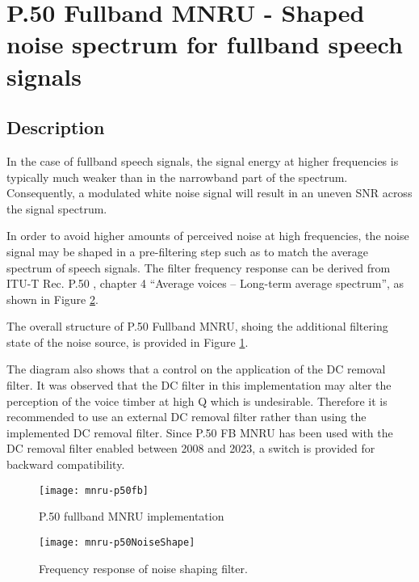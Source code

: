 \section{P.50 Fullband MNRU - Shaped noise spectrum for fullband speech signals} \label{fullband}

\subsection {Description}

In the case of fullband speech signals, the signal energy at higher frequencies is typically much weaker than in the
narrowband part of the spectrum.
Consequently, a modulated white noise signal will result in an uneven SNR across the signal spectrum.

In order to avoid higher amounts of perceived noise at high frequencies, the noise signal may be shaped in a pre-filtering
step such as to match the average spectrum of speech signals.
The filter frequency response can be derived from ITU-T Rec. P.50 \cite{P.50}, chapter 4 “Average voices – Long-term
average spectrum”, as shown in Figure \ref{MNRUP50}.

The overall structure of P.50 Fullband MNRU, shoing the additional filtering state of the noise source, is provided in
Figure \ref{MNRUP50FB}.

The diagram also shows that a control on the application of the DC removal filter.
It was observed that the DC filter in this implementation may alter the perception of the voice timber at high Q which
is undesirable.
Therefore it is recommended to use an external DC removal filter rather than using the implemented DC removal filter.
Since P.50 FB MNRU has been used with the DC removal filter enabled between 2008 and 2023, a switch is provided for
backward compatibility.

\begin{figure}[ht]
    \begin{center}
        \texttt{[image: mnru-p50fb]}
    \end{center}
    \caption{P.50 fullband MNRU implementation\label{MNRUP50FB}}
\end{figure}

\begin{figure}[ht]
    \begin{center}
        \texttt{[image: mnru-p50NoiseShape]}
    \end{center}
    \caption{Frequency response of noise shaping filter.\label{MNRUP50}}
\end{figure}

